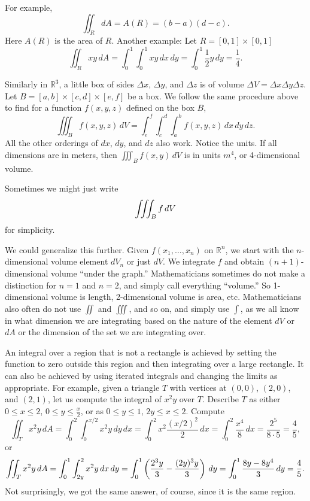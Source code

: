 \documentclass[12pt]{article}
\newcommand{\R}{{\mathbb{R}}}
\newcommand{\avoidbreak}{\postdisplaypenalty=100}
\begin{document}
For example,
\[
\iint_R dA = A(R) = (b-a)(d-c) .
\]
Here $A(R)$ is the area of $R$.  Another example:  Let $R = [0,1] \times [0,1]$
\[
\iint_R xy\, dA =
\int_0^1 \int_0^1 xy \, dx \, dy
=
\int_0^1 \frac{1}{2} y \, dy
= \frac{1}{4}.
\]

Similarly in $\R^3$, a little box of sides $\Delta x$, $\Delta y$, and $\Delta z$
is of volume $\Delta V = \Delta x \Delta y \Delta z$.  
Let $B = [a,b] \times [c,d] \times [e,f]$ be a box.
We follow the same procedure above to find for a function $f(x,y,z)$
defined on the box $B$,
\[
\iiint_B f(x,y,z) \, dV
=
\int_e^f \int_c^d \int_a^b f(x,y,z) \, dx \, dy \, dz .
\]
All the other orderings of $dx$, $dy$, and $dz$ also work.
Notice the units.  If all dimensions are in meters, then
$\iiint_B f(x,y) \, dV$ is in units $m^4$, or 4-dimensional volume.

Sometimes we might just write
\[
\iiint_B f \, dV
\avoidbreak
\]
for simplicity.

We could generalize this further. Given $f(x_1,\ldots,x_n)$ on $\R^n$, we start with
the $n$-dimensional volume element $dV_n$ or just $dV$.
We integrate $f$ and obtain
$(n+1)$-dimensional volume ``under the graph.''
Mathematicians sometimes do not make a distinction for $n=1$ and $n=2$, and simply call
everything ``volume.''
So 1-dimensional volume is length, 2-dimensional volume is
area, etc.
Mathematicians also often do not use $\iint$ and $\iiint$,
and so on, and simply use $\int$,
as we all know in what dimension we are integrating based on the nature of
the element $dV$ or $dA$ or the dimension of the
set we are integrating over.

An integral over a region that is not a rectangle
is achieved by setting the function to zero
outside this region and then integrating over
a large rectangle.  It can also be achieved by
using iterated integrals and
changing the limits as appropriate.  For example,
given a triangle $T$ with vertices at $(0,0)$, $(2,0)$,
and $(2,1)$, let us compute the integral of $x^2y$
over $T$.  Describe $T$ as either
$0 \leq x \leq 2$, $0 \leq y \leq \frac{x}{2}$, or as
$0 \leq y \leq 1$, $2y \leq x \leq 2$.  Compute
\[
\iint_T x^2 y \, dA
=
\int_0^2 \int_0^{x/2} x^2y \, dy \, dx
=
\int_0^2 x^2\frac{(x/2)^2}{2}  \, dx
=
\int_0^2 \frac{x^4}{8}  \, dx
=
 \frac{2^5}{8 \cdot 5} = \frac{4}{5} ,
\]
or
\[
\iint_T x^2 y \, dA
=
\int_0^1 \int_{2y}^{2} x^2y \, dx \, dy
=
\int_0^1 \left(\frac{2^3 y}{3} - \frac{(2y)^3y}{3} \right) \, dy
=
\int_0^1 \frac{8y-8y^4}{3} \, dy
=
\frac{4}{5} .
\avoidbreak
\]
Not surprisingly, we got the same answer, of course, since it is the same region.
\end{document}
